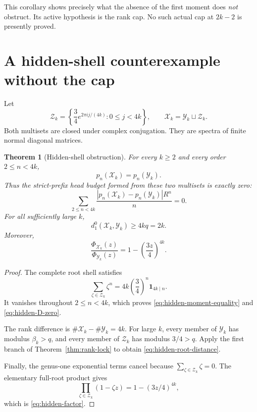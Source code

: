 \documentclass[11pt]{article}
\newtheorem{theorem}{Theorem}[section]
\theoremstyle{remark}
\newcommand{\cY}{\mathcal Y}
\newcommand{\cZ}{\mathcal Z}
\newcommand{\cX}{\mathcal X}
\newcommand{\one}{\mathbf 1}
\begin{document}
This corollary shows precisely what the absence of the first moment does
\emph{not} obstruct.  Its active hypothesis is the rank cap.  No such actual
cap at $2k-2$ is presently proved.

\section{A hidden-shell counterexample without the cap}

Let
\begin{equation}\label{eq:hidden-shell}
 \cZ_k=\left\{\frac34e^{2\pi ij/(4k)}:0\le j<4k\right\},
 \qquad \cX_k=\cY_k\sqcup\cZ_k.
\end{equation}
Both multisets are closed under complex conjugation.  They are spectra of
finite normal diagonal matrices.

\begin{theorem}[Hidden-shell obstruction]
\label{thm:hidden-shell}
For every $k\ge2$ and every order $2\le n<4k$,
\begin{equation}\label{eq:hidden-moment-equality}
 p_n(\cX_k)=p_n(\cY_k).
\end{equation}
Thus the strict-prefix head budget formed from these two multisets is exactly
zero:
\begin{equation}\label{eq:hidden-D-zero}
 \sum_{2\le n<4k}
 \frac{|p_n(\cX_k)-p_n(\cY_k)|R^n}{n}=0.
\end{equation}
For all sufficiently large $k$,
\begin{equation}\label{eq:hidden-root-distance}
 d_1^0(\cX_k,\cY_k)\ge4kq=2k.
\end{equation}
Moreover,
\begin{equation}\label{eq:hidden-factor}
 \frac{\Phi_{\cX_k}(z)}{\Phi_{\cY_k}(z)}
 =1-\left(\frac{3z}{4}\right)^{4k}.
\end{equation}
\end{theorem}

\begin{proof}
The complete root shell satisfies
\begin{equation}\label{eq:shell-power}
 \sum_{\zeta\in\cZ_k}\zeta^n
 =4k\left(\frac34\right)^n\one_{4k\mid n}.
\end{equation}
It vanishes throughout $2\le n<4k$, which proves
\eqref{eq:hidden-moment-equality} and \eqref{eq:hidden-D-zero}.

The rank difference is $\#\cX_k-\#\cY_k=4k$.  For large $k$, every member
of $\cY_k$ has modulus $\beta_k>q$, and every member of $\cZ_k$ has modulus
$3/4>q$.  Apply the first branch of Theorem~\ref{thm:rank-lock} to obtain
\eqref{eq:hidden-root-distance}.

Finally, the genus-one exponential terms cancel because
$\sum_{\zeta\in\cZ_k}\zeta=0$.  The elementary full-root product gives
\begin{equation}\label{eq:full-root-product}
 \prod_{\zeta\in\cZ_k}(1-\zeta z)
 =1-(3z/4)^{4k},
\end{equation}
which is \eqref{eq:hidden-factor}.
\end{proof}
\end{document}
